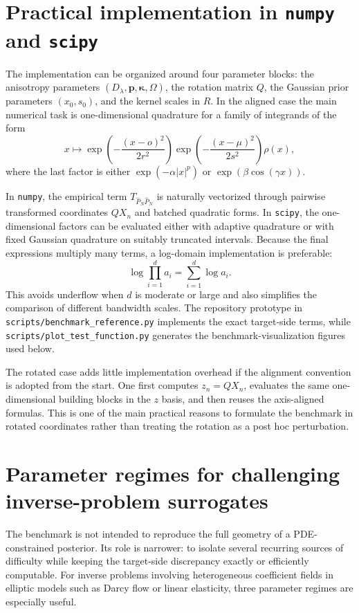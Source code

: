 \documentclass[11pt,a4paper]{article}
\newcommand{\symbfit}[1]{\bm{#1}}
\newcommand{\vc}[1]{{\symbfit{#1}}}
\begin{document}
\section{Practical implementation in \texttt{numpy} and \texttt{scipy}}

The implementation can be organized around four parameter blocks: the anisotropy parameters $(D_{\lambda},\vc p,\vc\kappa,\Omega)$, the rotation matrix $Q$, the Gaussian prior parameters $(x_0,s_0)$, and the kernel scales in $R$. In the aligned case the main numerical task is one-dimensional quadrature for a family of integrands of the form
\[
x \mapsto
\exp\!\left(-\frac{(x-o)^2}{2r^2}\right)
\exp\!\left(-\frac{(x-\mu)^2}{2s^2}\right)
\rho(x),
\]
where the last factor is either $\exp(-\alpha |x|^p)$ or $\exp(\beta \cos(\gamma x))$.

In \texttt{numpy}, the empirical term $T_{\widehat P_N\widehat P_N}$ is naturally vectorized through pairwise transformed coordinates $QX_n$ and batched quadratic forms. In \texttt{scipy}, the one-dimensional factors can be evaluated either with adaptive quadrature or with fixed Gaussian quadrature on suitably truncated intervals. Because the final expressions multiply many terms, a log-domain implementation is preferable:
\[
\log \prod_{i=1}^d a_i = \sum_{i=1}^d \log a_i.
\]
This avoids underflow when $d$ is moderate or large and also simplifies the comparison of different bandwidth scales. The repository prototype in \texttt{scripts/benchmark\_reference.py} implements the exact target-side terms, while \texttt{scripts/plot\_test\_function.py} generates the benchmark-visualization figures used below.

The rotated case adds little implementation overhead if the alignment convention is adopted from the start. One first computes $z_n = QX_n$, evaluates the same one-dimensional building blocks in the $z$ basis, and then reuses the axis-aligned formulas. This is one of the main practical reasons to formulate the benchmark in rotated coordinates rather than treating the rotation as a post hoc perturbation.

\section{Parameter regimes for challenging inverse-problem surrogates}

The benchmark is not intended to reproduce the full geometry of a PDE-constrained posterior. Its role is narrower: to isolate several recurring sources of difficulty while keeping the target-side discrepancy exactly or efficiently computable. For inverse problems involving heterogeneous coefficient fields in elliptic models such as Darcy flow or linear elasticity, three parameter regimes are especially useful.
\end{document}
